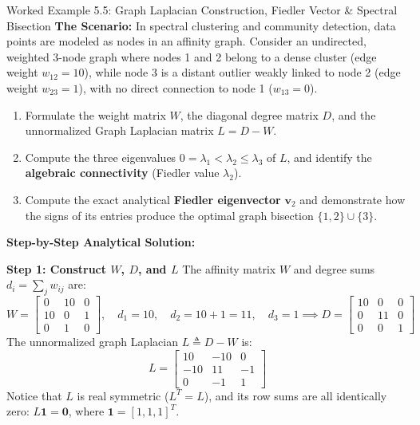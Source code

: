 \begin{examplebox}{Worked Example 5.5: Graph Laplacian Construction, Fiedler Vector \& Spectral Bisection}
\label{ex:w05_graph_laplacian_fiedler}
\textbf{The Scenario:}
In spectral clustering and community detection, data points are modeled as nodes in an affinity graph. Consider an undirected, weighted 3-node graph where nodes 1 and 2 belong to a dense cluster (edge weight $w_{12} = 10$), while node 3 is a distant outlier weakly linked to node 2 (edge weight $w_{23} = 1$), with no direct connection to node 1 ($w_{13} = 0$).
\begin{enumerate}
    \item Formulate the weight matrix $W$, the diagonal degree matrix $D$, and the unnormalized Graph Laplacian matrix $L = D - W$.
    \item Compute the three eigenvalues $0 = \lambda_1 < \lambda_2 \le \lambda_3$ of $L$, and identify the \textbf{algebraic connectivity} (Fiedler value $\lambda_2$).
    \item Compute the exact analytical \textbf{Fiedler eigenvector} $\mathbf{v}_2$ and demonstrate how the signs of its entries produce the optimal graph bisection $\{1, 2\} \cup \{3\}$.
\end{enumerate}

\tcblower
\textbf{Step-by-Step Analytical Solution:}

\textbf{Step 1: Construct $W$, $D$, and $L$}
The affinity matrix $W$ and degree sums $d_i = \sum_j w_{ij}$ are:
\begin{equation*}
W = \begin{bmatrix} 0 & 10 & 0 \\ 10 & 0 & 1 \\ 0 & 1 & 0 \end{bmatrix}, \quad
d_1 = 10, \quad d_2 = 10 + 1 = 11, \quad d_3 = 1 \implies D = \begin{bmatrix} 10 & 0 & 0 \\ 0 & 11 & 0 \\ 0 & 0 & 1 \end{bmatrix}
\end{equation*}
The unnormalized graph Laplacian $L \triangleq D - W$ is:
\begin{equation*}
L = \begin{bmatrix} 10 & -10 & 0 \\ -10 & 11 & -1 \\ 0 & -1 & 1 \end{bmatrix}
\end{equation*}
Notice that $L$ is real symmetric ($L^T = L$), and its row sums are all identically zero: $L \mathbf{1} = \mathbf{0}$, where $\mathbf{1} = [1, 1, 1]^T$.


\end{examplebox}
